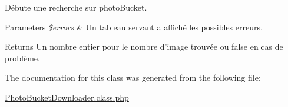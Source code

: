 Débute une recherche sur photo\-Bucket. 


\begin{DoxyParams}{Parameters}
{\em \$errors} & Un tableau servant a affiché les possibles erreurs. \\
\hline
\end{DoxyParams}
\begin{DoxyReturn}{Returns}
Un nombre entier pour le nombre d'image trouvée ou false en cas de problème. 
\end{DoxyReturn}


The documentation for this class was generated from the following file\-:\begin{DoxyCompactItemize}
\item 
\hyperlink{_photo_bucket_downloader_8class_8php}{Photo\-Bucket\-Downloader.\-class.\-php}\end{DoxyCompactItemize}
